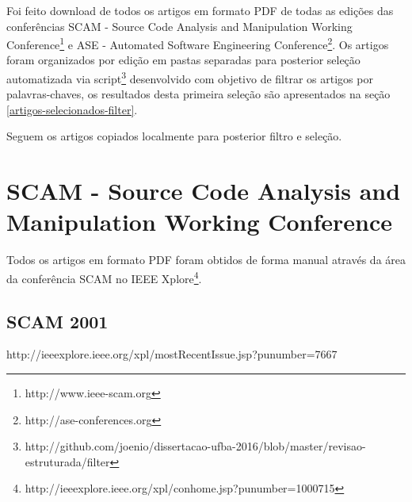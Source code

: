 
Foi feito download de todos os artigos em formato PDF de todas as edições das
conferências SCAM - Source Code Analysis and Manipulation Working
Conference\footnote{http://www.ieee-scam.org} e ASE - Automated Software
Engineering Conference\footnote{http://ase-conferences.org}.
Os artigos foram organizados por edição em pastas separadas para posterior
seleção automatizada via script\footnote{http://github.com/joenio/dissertacao-ufba-2016/blob/master/revisao-estruturada/filter} desenvolvido com objetivo de filtrar os
artigos por palavras-chaves, os resultados desta primeira seleção são apresentados
na seção \ref{artigos-selecionados-filter}.

Seguem os artigos copiados localmente para posterior filtro e seleção.

%
%
%
%
%
%
%

\section{SCAM - Source Code Analysis and Manipulation Working Conference}

Todos os artigos em formato PDF foram obtidos de forma manual através da área
da conferência SCAM no IEEE
Xplore\footnote{http://ieeexplore.ieee.org/xpl/conhome.jsp?punumber=1000715}.

\subsection{SCAM 2001}

http://ieeexplore.ieee.org/xpl/mostRecentIssue.jsp?punumber=7667

